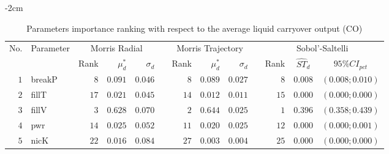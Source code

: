 \begin{table*}[!htbp]\centering
{}
\begin{adjustwidth*}{}{-2cm}
\caption{Parameters importance ranking with respect to the average liquid carryover output (CO)}
\label{tab:app_screening_co_average}
\begin{tabular}{@{}rlrrrrrrrrrcc@{}}\toprule
\multirow{2}{*}{\footnotesize{No.}} & \multirow{2}{*}{\footnotesize{Parameter}} & \multicolumn{3}{c}{\footnotesize{Morris Radial}} & \phantom{a} & \multicolumn{3}{c}{\footnotesize{Morris Trajectory}}  &\phantom{a}& \multicolumn{3}{c}{\footnotesize{Sobol'-Saltelli}}                               \\             
                                                                                  \cmidrule{3-5}                                                   \cmidrule{7-9}                                                      \cmidrule{11-13}
                                    &                                           & \footnotesize{Rank}   & $\mu^*_d$ & $\sigma_d$   &             & \footnotesize{Rank} & $\mu^*_d$ & $\sigma_d$          &           & \footnotesize{Rank} & \footnotesize{$\hat{ST}_d$} & \footnotesize{$95\%CI_{pct}$}\\ \midrule
\footnotesize{$1 $} & \footnotesize{breakP   } & \footnotesize{$8 $} & \footnotesize{$0.091$} & \footnotesize{$0.046$} && \footnotesize{$8 $} & \footnotesize{$0.089$} & \footnotesize{$0.027$} && \footnotesize{$8 $} & \footnotesize{$0.008$} & \footnotesize{$(0.008;0.010)$} \\
\footnotesize{$2 $} & \footnotesize{fillT    } & \footnotesize{$17$} & \footnotesize{$0.021$} & \footnotesize{$0.045$} && \footnotesize{$14$} & \footnotesize{$0.012$} & \footnotesize{$0.011$} && \footnotesize{$15$} & \footnotesize{$0.000$} & \footnotesize{$(0.000;0.000)$} \\
\footnotesize{$3 $} & \footnotesize{fillV    } & \footnotesize{$3 $} & \footnotesize{$0.628$} & \footnotesize{$0.070$} && \footnotesize{$2 $} & \footnotesize{$0.644$} & \footnotesize{$0.025$} && \footnotesize{$1 $} & \footnotesize{$0.396$} & \footnotesize{$(0.358;0.439)$} \\
\footnotesize{$4 $} & \footnotesize{pwr      } & \footnotesize{$14$} & \footnotesize{$0.025$} & \footnotesize{$0.052$} && \footnotesize{$11$} & \footnotesize{$0.020$} & \footnotesize{$0.025$} && \footnotesize{$12$} & \footnotesize{$0.000$} & \footnotesize{$(0.000;0.001)$} \\
\footnotesize{$5 $} & \footnotesize{nicK     } & \footnotesize{$22$} & \footnotesize{$0.016$} & \footnotesize{$0.084$} && \footnotesize{$27$} & \footnotesize{$0.003$} & \footnotesize{$0.004$} && \footnotesize{$25$} & \footnotesize{$0.000$} & \footnotesize{$(0.000;0.000)$} \\

\end{tabular}
\end{adjustwidth*}
\end{table*}
